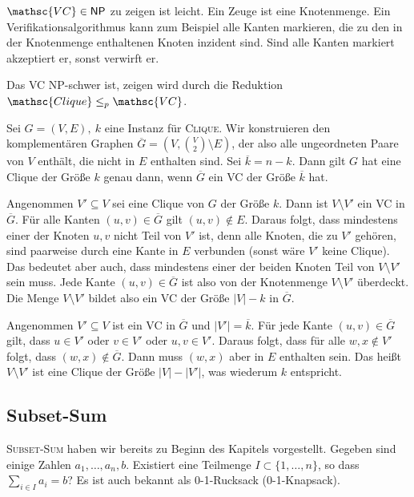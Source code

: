 \begin{Bew}
  \hspace{\parindent}$\mathsc{VC} \in \mathsf{NP}$ zu zeigen ist leicht. Ein Zeuge ist eine Knotenmenge. Ein Verifikationsalgorithmus kann zum Beispiel alle Kanten markieren, die zu den in der Knotenmenge enthaltenen Knoten inzident sind. Sind alle Kanten markiert akzeptiert er, sonst verwirft er.
  
  Das \textsc{VC} \textsf{NP}-schwer ist, zeigen wird durch die Reduktion $\mathsc{Clique} \le_p \mathsc{VC}$.
  
  Sei $G=(V, E),~k$ eine Instanz für \textsc{Clique}. Wir konstruieren den komplementären Graphen $\overline{G} = (V, \binom{V}{2} \setminus E)$, der also alle ungeordneten Paare von $V$ enthält, die nicht in $E$ enthalten sind. Sei $\overline{k}= n - k$. Dann gilt $G$ hat eine Clique der Größe $k$ genau dann, wenn $\overline{G}$ ein \textsc{VC} der Größe $\overline{k}$ hat.
  
  Angenommen $V' \subseteq V$ sei eine Clique von $G$ der Größe $k$. Dann ist $V \setminus V'$ ein VC in $\overline{G}$. Für alle Kanten $(u, v) \in \overline{G}$ gilt $(u, v) \notin E$. Daraus folgt, dass mindestens einer der Knoten $u, v$ nicht Teil von $V'$ ist, denn alle Knoten, die zu $V'$ gehören, sind paarweise durch eine Kante in $E$ verbunden (sonst wäre $V'$ keine Clique). Das bedeutet aber auch, dass mindestens einer der beiden Knoten Teil von $V \setminus V'$ sein muss. Jede Kante $(u, v) \in \overline{G}$ ist also von der Knotenmenge $V \setminus V'$ überdeckt. Die Menge $V \setminus V'$ bildet also ein VC der Größe $|V| - k$ in $\overline{G}$.
  
  Angenommen $V' \subseteq V$ ist ein VC in $\overline{G}$ und $|V'| = \overline{k}$. Für jede Kante $(u, v) \in \overline{G}$ gilt, dass $u \in V'$ oder $v \in V'$ oder $u,v \in V'$. Daraus folgt, dass für alle $w, x \notin V'$ folgt, dass $(w, x) \notin \overline{G}$. Dann muss $(w, x)$ aber in $E$ enthalten sein. Das heißt $V \setminus V'$ ist eine Clique der Größe $|V| - |V'|$, was wiederum $k$ entspricht.
\end{Bew}

\subsection{Subset-Sum}
\textsc{Subset-Sum} haben wir bereits zu Beginn des Kapitels vorgestellt. Gegeben sind einige Zahlen $a_1, \ldots, a_n, b$. Existiert eine Teilmenge $I \subset \{1, \ldots, n\}$, so dass $\sum_{i \in I} a_i = b$? Es ist auch bekannt als \textsf{0-1-Rucksack} (\textsf{0-1-Knapsack}).


